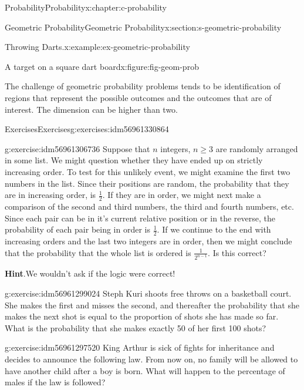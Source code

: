 \documentclass[twoside,10pt,]{book}
\newcommand{\blocktitlefont}{\relax}
\numberwithin{equation}{section}
\begin{document}
\begin{chapterptx}{Probability}{}{Probability}{}{}{x:chapter:c-probability}
\begin{sectionptx}{Geometric Probability}{}{Geometric Probability}{}{}{x:section:s-geometric-probability}
\begin{example}{Throwing Darts.}{x:example:ex-geometric-probability}
\begin{figureptx}{A target on a square dart board}{x:figure:fig-geom-prob}{}
\begin{image}{0.2}{0.6}{0.2}
\end{image}%
\tcblower
\end{figureptx}%
\end{example}
The challenge of geometric probability problems tends to be identification of regions that represent the possible outcomes and the outcomes that are of interest. The dimension can be higher than two.%
\end{sectionptx}
%
%
\typeout{************************************************}
\typeout{************************************************}
%
\begin{exercises-section}{Exercises}{}{Exercises}{}{}{g:exercises:idm56961330864}
\begin{divisionexercise}{1}{}{}{g:exercise:idm56961306736}%
Suppose that \(n\)  integers, \(n \geq 3\) are randomly arranged in some list.  We might question whether they have ended up on strictly increasing order.   To test for this unlikely event, we might examine the first two numbers in the list.  Since their positions are random, the probability that they are in increasing order, is \(\frac{1}{2}\). If they are in order, we might next make a comparison of the second and third numbers, the third and fourth numbers, etc. Since each pair can be in it's current relative position or in the reverse, the probability of each pair being in order is \(\frac{1}{2}\). If we continue to the end with increasing orders and the last two integers are in order, then we might conclude that the probability that the whole list is ordered is \(\frac{1}{2^{n-1}}\).  Is this correct?%
\par\smallskip%
\noindent\textbf{\blocktitlefont Hint}.\hypertarget{g:hint:idm56961305312}{}\quad{}We wouldn't ask if the logic were correct!%
\end{divisionexercise}%
\begin{divisionexercise}{2}{}{}{g:exercise:idm56961299024}%
Steph Kuri shoots free throws on a basketball court. She makes the first and misses the second, and thereafter the probability that she makes the next shot is equal to the proportion of shots she has made so far. What is the probability that she makes exactly 50 of her first 100 shots?%
\end{divisionexercise}%
\begin{divisionexercise}{3}{}{}{g:exercise:idm56961297520}%
King Arthur is sick of fights for inheritance and decides to announce the following law. From now on, no family will be allowed to have another child after a boy is born. What will happen to the percentage of males if the law is followed?%

\end{divisionexercise}
\end{exercises-section}
\end{chapterptx}
\end{document}
